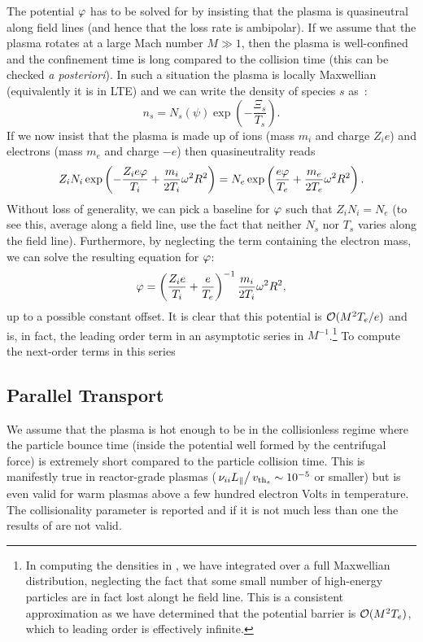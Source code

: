 \documentclass{revtex4}
\begin{document}
The potential $\varphi$ has to be solved for by insisting that the plasma is quasineutral along field lines (and hence that the loss rate is ambipolar).
If we assume that the plasma rotates at a large Mach number $M \gg 1$, then the plasma is well-confined and the confinement time is long compared to the collision time (this can be checked \textit{a posteriori}). In such a situation the plasma is locally Maxwellian (equivalently it is in LTE) and we can write the density of species $s$ as~\cite{catto:2784,flowtome1}:
\begin{equation}
n_s = N_s(\psi) \exp\left( - \frac{\Xi_s}{T_s} \right).
\label{confinedDensity}
\end{equation}
If we now insist that the plasma is made up of ions (mass $m_i$ and charge $Z_i e$) and electrons (mass $m_e$ and charge $-e$) then quasineutrality reads
\begin{equation}
Z_i N_i \exp\left( - \frac{Z_i e\varphi}{T_i} + \frac{m_i}{2T_i} \omega^2 R^2 \right) = N_e \exp\left( \frac{e\varphi}{T_e} + \frac{m_e}{2T_e} \omega^2 R^2 \right).
\end{equation}
Without loss of generality, we can pick a baseline for $\varphi$ such that $Z_i N_i = N_e$ (to see this, average along a field line, use the fact that neither $N_s$ nor $T_s$ varies along the field line). Furthermore, by neglecting the term containing the electron mass, we can solve the resulting equation for $\varphi$:
\begin{equation}
\varphi = \left( \frac{Z_i e}{T_i} + \frac{e}{T_e}\right)^{-1} \frac{m_i}{2 T_i} \omega^2 R^2,
\end{equation}
up to a possible constant offset. It is clear that this potential is $\mathcal{O}(M^2T_e/e)$ and is, in fact, the leading order term in an asymptotic series in $M^{-1}$.\footnote{In computing the densities in , we have integrated over a full Maxwellian distribution, neglecting the fact that some small number of high-energy particles are in fact lost alongt he field line. This is a consistent approximation as we have determined that the potential barrier is $\mathcal{O}(M^2T_e)$, which to leading order is effectively infinite.} To compute the next-order terms in this series 

\subsection{Parallel Transport}

We assume that the plasma is hot enough to be in the collisionless regime where the particle bounce time (inside the potential well formed by the centrifugal force) is extremely short compared to the particle collision time. This is manifestly true in reactor-grade plasmas ($\left.\nu_{ii} L_\parallel \right/ v_{\mathrm{th}_s} \sim 10^{-5}$ or smaller) but is even valid for warm plasmas above a few hundred electron Volts in temperature. The collisionality parameter is reported and if it is not much less than one the results of \mctrans{} are not valid.
\end{document}
